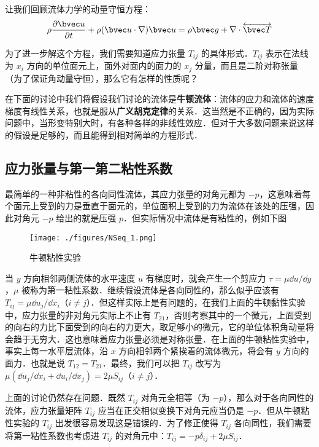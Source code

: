 
让我们回顾流体力学的动量守恒方程：
\begin{equation}
\rho \frac{\partial \bvec u}{\partial t}+\rho(\bvec u\cdot \nabla)\bvec u=\rho \bvec g+\nabla\cdot \overleftrightarrow {\bvec T}
\end{equation}

为了进一步解这个方程，我们需要知道应力张量 $T_{ij}$ 的具体形式．$T_{ij}$ 表示在法线为 $x_i$ 方向的单位面元上，面外对面内的面力的 $x_j$ 分量，而且是二阶对称张量（为了保证角动量守恒），那么它有怎样的性质呢？

在下面的讨论中我们将假设我们讨论的流体是\textbf{牛顿流体}：流体的应力和流体的速度梯度有线性关系，也就是服从\textbf{广义胡克定律}的关系．这当然是不正确的，因为实际问题中，当形变特别大时，有各种各样的非线性效应．但对于大多数问题来说这样的假设是足够的，而且能得到相对简单的方程形式．

\subsection{应力张量与第一第二粘性系数}
最简单的一种非粘性的各向同性流体，其应力张量的对角元都为 $-p$，这意味着每个面元上受到的力是垂直于面元的，单位面积上受到的力为流体在该处的压强，因此对角元 $-p$ 给出的就是压强 $p$．但实际情况中流体是有粘性的，例如下图
\begin{figure}[ht]
\centering
\texttt{[image: ./figures/NSeq\_1.png]}
\caption{牛顿粘性实验} \label{NSeq_fig1}
\end{figure}
当 $y$ 方向相邻两侧流体的水平速度 $u$ 有梯度时，就会产生一个剪应力 $\tau=\mu \dd u/\dd y$，$\mu$ 被称为第一粘性系数．继续假设流体是各向同性的，那么似乎应该有 $T_{ij}=\mu \dd u_j/\dd x_i$（$i\neq j$）．但这样实际上是有问题的，在我们上面的牛顿黏性实验中，应力张量的非对角元实际上不止有 $T_{21}$，否则考察其中的一个微元，上面受到的向右的力比下面受到的向右的力更大，取足够小的微元，它的单位体积角动量将会趋于无穷大．这也意味着应力张量必须是对称张量．在上面的牛顿粘性实验中，事实上每一水平层流体，沿 $x$ 方向相邻两个紧挨着的流体微元，将会有 $y$ 方向的面力．也就是说 $T_{12}=T_{21}$．最终，我们可以把 $T_{ij}$ 改写为 $\mu (\dd u_j/\dd x_i+\dd u_i/\dd x_j)=2\mu S_{ij}$（$i\neq j$）．

上面的讨论仍然存在问题．既然 $T_{ij}$ 对角元全相等（为 $-p$），那么对于各向同性的流体，应力张量矩阵 $T_{ij}$ 应当在正交相似变换下对角元应当仍是 $-p$．但从牛顿粘性实验的 $T_{ij}$ 出发很容易发现这是错误的．为了修正使得 $T_{ij}$ 各向同性，我们需要将第一粘性系数也考虑进 $T_{ij}$ 的对角元中：$T_{ij} = -p\delta_{ij}+2\mu S_{ij}$．

